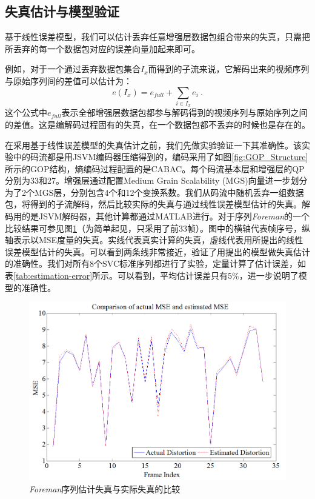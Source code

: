 \subsection{失真估计与模型验证}
\label{subsec:distortion-estimation}

基于线性误差模型，我们可以估计丢弃任意增强层数据包组合带来的失真，只需把所丢弃的每一个数据包对应的误差向量加起来即可。

例如，对于一个通过丢弃数据包集合$I_x$而得到的子流来说，它解码出来的视频序列与原始序列间的差值可以估计为：
\begin{equation}
\label{eq:subset_error}
e(I_x) = e_{full} + \sum_{i \in {I_x}} e_i \: .
\end{equation}
这个公式中$e_{full}$表示全部增强层数据包都参与解码得到的视频序列与原始序列之间的差值。这是编解码过程固有的失真，在一个数据包都不丢弃的时候也是存在的。

在采用基于线性误差模型的失真估计之前，我们先做实验验证一下其准确性。该实验中的码流都是用JSVM编码器压缩得到的，编码采用了如图\ref{fig:GOP_Structure}所示的GOP结构，熵编码过程配置的是CABAC。每个码流基本层和增强层的QP分别为33和27。增强层通过配置Medium Grain Scalability (MGS)向量进一步划分为了2个MGS层，分别包含4个和12个变换系数。我们从码流中随机丢弃一组数据包，将得到的子流解码，然后比较实际的失真与通过线性误差模型估计的失真。解码用的是JSVM解码器，其他计算都通过MATLAB进行。对于序列{\em Foreman}的一个比较结果可参见图\ref{fig:model_verification}（为简单起见，只采用了前33帧）。图中的横轴代表帧序号，纵轴表示以MSE度量的失真。实线代表真实计算的失真，虚线代表用所提出的线性误差模型估计的失真。可以看到两条线非常接近，验证了用提出的模型做失真估计的准确性。我们对所有8个SVC标准序列都进行了实验，定量计算了估计误差，如表\ref{tab:estimation-error}所示。可以看到，平均估计误差只有5\%，进一步说明了模型的准确性。

\begin{figure}[h]
	\centering
	\includegraphics[width = 0.8\linewidth]{figures/ModelVerification.png}
	\caption{{\em Foreman}序列估计失真与实际失真的比较 \label{fig:model_verification}}
\end{figure}

